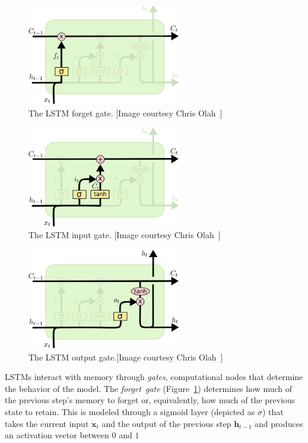 \begin{figure}[p]
	\centering
	\includegraphics[width=0.6\textwidth]{figures/LSTM_forget_gate.pdf}
	\caption{The LSTM forget gate. [Image courtesy Chris Olah~\cite{colah_15}]\label{fig:LSTM_forget_gate}}
\end{figure}
\begin{figure}[p]
	\centering
	\includegraphics[width=0.6\textwidth]{figures/LSTM_input_gate.pdf}
	\caption{The LSTM input gate. [Image courtesy Chris Olah~\cite{colah_15}]\label{fig:LSTM_input_gate}}
\end{figure}
\begin{figure}[p]
	\centering
	\includegraphics[width=0.6\textwidth]{figures/LSTM_output_gate.pdf}
	\caption{The LSTM output gate.[Image courtesy Chris Olah~\cite{colah_15}]\label{fig:LSTM_output_gate}}
\end{figure}

LSTMs interact with memory through \emph{gates}, computational nodes that determine the behavior of the model. The \emph{forget~gate} (Figure~\ref{fig:LSTM_forget_gate}) determines how much of the previous step's memory to forget or, equivalently, how much of the previous state to retain.  This is modeled through a sigmoid layer (depicted as $\sigma$) that takes the current input $\mathbf{x}_t$ and the output of the previous step $\mathbf{h}_{t-1}$ and produces an activation vector between $0$ and $1$

